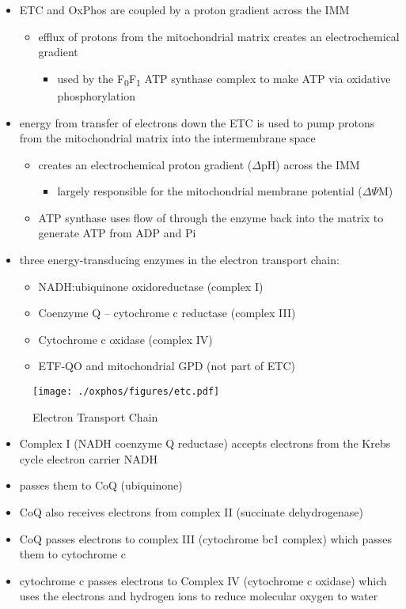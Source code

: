 \documentclass{scrartcl}
\begin{document}
\begin{itemize}
\item ETC and OxPhos are coupled by a proton gradient across the IMM
\begin{itemize}
\item efflux of protons from the mitochondrial matrix creates an
electrochemical gradient
\begin{itemize}
\item used by the F\textsubscript{0}F\textsubscript{1} ATP synthase complex to make ATP via oxidative phosphorylation
\end{itemize}
\end{itemize}
\item energy from transfer of electrons down the ETC is used to pump
protons from the mitochondrial matrix into the intermembrane space
\begin{itemize}
\item creates an electrochemical proton gradient (\(\Delta\)pH) across the IMM
\begin{itemize}
\item largely responsible for the mitochondrial membrane potential (\(\Delta \Psi\)M)
\end{itemize}
\item ATP synthase uses flow of  through the enzyme back into the
matrix to generate ATP from ADP and Pi
\end{itemize}
\item three energy-transducing enzymes in the electron transport chain:
\begin{itemize}
\item NADH:ubiquinone oxidoreductase (complex I)
\item Coenzyme Q – cytochrome c reductase (complex III)
\item Cytochrome c oxidase (complex IV)
\item ETF-QO and mitochondrial GPD (not part of ETC)
\end{itemize}
\end{itemize}

\begin{figure}[htbp]
\centering
\texttt{[image: ./oxphos/figures/etc.pdf]}
\caption{\label{fig:orgf7f707e}Electron Transport Chain}
\end{figure}

\begin{itemize}
\item Complex I (NADH coenzyme Q reductase) accepts electrons from the
Krebs cycle electron carrier NADH
\item passes them to CoQ (ubiquinone)
\item CoQ also receives electrons from complex II (succinate dehydrogenase)
\item CoQ passes electrons to complex III (cytochrome bc1 complex) which
passes them to cytochrome c
\item cytochrome c passes electrons to Complex IV (cytochrome c oxidase)
which uses the electrons and hydrogen ions to reduce molecular
oxygen to water
\end{itemize}
\end{document}
